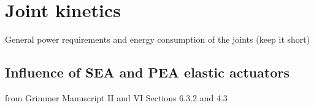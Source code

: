 
\section{Joint kinetics} %
\label{sec:joint_kinetics}
General power requirements and energy consumption of the joints (keep it short) 

\subsection{Influence of SEA and PEA elastic actuators} %
\label{sub:influence_of_sea_and_pea_elactic_actuators}
 from Grimmer Manuscript II and VI
 Sections 6.3.2 and 4.3



